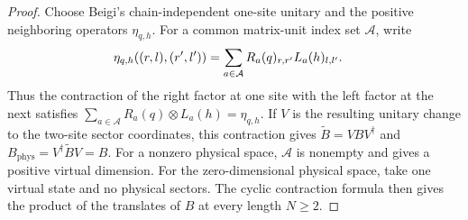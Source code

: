 \begin{proof}\leanok
    Choose Beigi's chain-independent one-site unitary and the positive
    neighboring operators $\eta_{q,h}$. For a common matrix-unit index set
    $\mathcal A$, write
    \begin{align}
        \eta_{q,h}((r,l),(r',l'))
         & =
        \sum_{a\in\mathcal A}
        R_a(q)_{r,r'}L_a(h)_{l,l'}.
        \notag
    \end{align}
    Thus the contraction of the right factor at one site with the left factor
    at the next satisfies
    $\sum_{a\in\mathcal A}R_a(q)\otimes L_a(h)=\eta_{q,h}$.
    If $V$ is the resulting unitary change to the two-site sector
    coordinates, this contraction gives
    $\widetilde B=VBV^\dagger$ and
    $B_{\mathrm{phys}}=V^\dagger\widetilde B V=B$.
    For a nonzero physical space, $\mathcal A$ is nonempty and gives a positive
    virtual dimension. For the zero-dimensional physical space, take one
    virtual state and no physical sectors. The cyclic contraction formula
    then gives the product of the translates of $B$ at every length $N\ge2$.
\end{proof}

